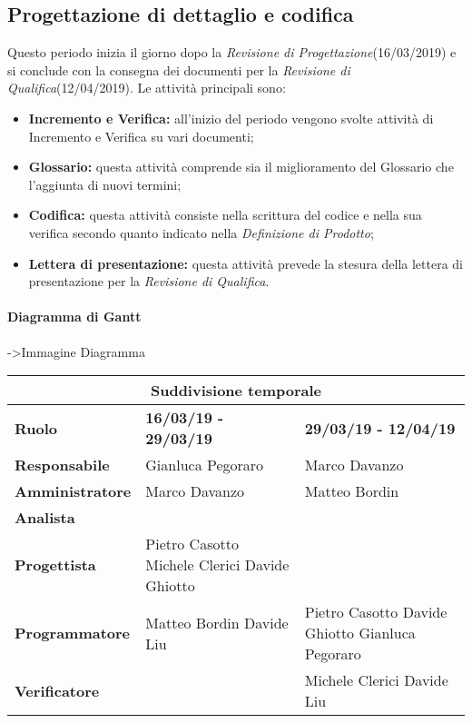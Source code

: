 \subsection{Progettazione di dettaglio e codifica}
Questo periodo inizia il giorno dopo la \textit{Revisione di Progettazione}(16/03/2019) e si conclude
con la consegna dei documenti per la \textit{Revisione di Qualifica}(12/04/2019). Le attività principali sono:
\begin{itemize}
	\item{\textbf{Incremento e Verifica:} all’inizio del periodo vengono svolte attività di Incremento e Verifica su vari documenti;}
	\item{\textbf{Glossario:} questa attività comprende sia il miglioramento del Glossario che l’aggiunta di nuovi termini;}
	\item{\textbf{Codifica:} questa attività consiste nella scrittura del codice e nella sua verifica secondo quanto indicato nella \textit{Definizione di Prodotto};}
	\item{\textbf{Lettera di presentazione:} questa attività prevede la stesura della lettera
		di presentazione per la \textit{Revisione di Qualifica}.}
\end{itemize}

\paragraph{Diagramma di Gantt}
->Immagine Diagramma

\begin{tabular}{|l|l|l|}
	\hline
	\multicolumn{3}{|c|}{\textbf{Suddivisione temporale}}\\
	\hline
	\textbf{Ruolo} & \textbf{16/03/19 - 29/03/19} & \textbf{29/03/19 - 12/04/19} \\
	\hline
	\textbf{Responsabile} & Gianluca Pegoraro & Marco Davanzo \\
	\hline
	\textbf{Amministratore} & Marco Davanzo & Matteo Bordin  \\
	\hline
	\textbf{Analista} & &  \\
	\hline
	\textbf{Progettista} & Pietro Casotto Michele Clerici Davide Ghiotto &  \\
	\hline
	\textbf{Programmatore} & Matteo Bordin Davide Liu & Pietro Casotto Davide Ghiotto Gianluca Pegoraro \\
	\hline
	\textbf{Verificatore} &  & Michele Clerici Davide Liu \\
	\hline
\end{tabular}

